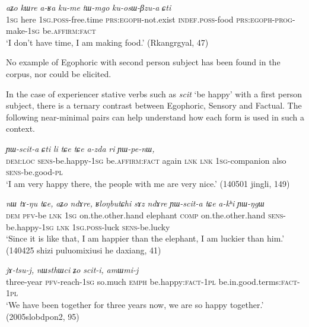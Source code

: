 \documentclass[oldfontcommands,oneside,a4paper,11pt]{article}
\newcommand{\ipa}[1]{{\phon\textit{#1}}} %
\newcommand{\factual}[1]{\textsc{:fact}}
\begin{document}
\begin{exe}
\ex \label{ex:kume}
\gll 
\ipa{aʑo}  	\ipa{kɯre}  	\ipa{a-ʁa}  	\ipa{ku-me}  \ipa{tɯ-mgo} 	\ipa{ku-osɯ-βzu-a} 	\ipa{ɕti} 	  	\\
\textsc{1sg} here \textsc{1sg.poss}-free.time \textsc{prs:egoph}-not.exist \textsc{indef.poss}-food \textsc{prs:egoph}-\textsc{prog}-make-\textsc{1sg} be.\textsc{affirm}\factual{}  \\
\glt `I don't have time, I am making food.'  (Rkangrgyal, 47)
\end{exe}

No example of Egophoric with second person subject has been found in the corpus, nor could be elicited.

In the case of experiencer stative verbs such as \ipa{scit} `be happy' with a first person subject, there is a ternary contrast between Egophoric, Sensory and Factual. The following near-minimal pairs can help understand how each form is used in such a context.

\begin{exe}
\ex \label{ex:YWscita}
\gll  \ipa{nɯtɕu} 	\ipa{ɲɯ-scit-a} 	\ipa{ɕti} 	\ipa{li} 	\ipa{tɕe} 	\ipa{tɕe} 	\ipa{a-zda} 	\ipa{ri} 	\ipa{ɲɯ-pe-nɯ,} \\
\textsc{dem:loc} \textsc{sens}-be.happy-\textsc{1sg} be.\textsc{affirm}:\textsc{fact} again \textsc{lnk} \textsc{lnk} \textsc{1sg}-companion also \textsc{sens}-be.good-\textsc{pl} \\
\glt `I am very happy there, the people with me are very nice.' (140501 jingli, 149)
\end{exe}


\begin{exe}
\ex \label{ex:YWscita2}
\gll 
\ipa{nɯ} 	\ipa{tɤ-ŋu} 	\ipa{tɕe,} 	\ipa{aʑo} 	\ipa{ndɤre,} 	\ipa{ʁloŋbutɕhi} 	\ipa{sɤz} 	\ipa{ndɤre} 	\ipa{ɲɯ-scit-a} 	\ipa{tɕe} 	\ipa{a-kʰi} 	\ipa{ɲɯ-ŋgɯ} \\
\textsc{dem} \textsc{pfv}-be \textsc{lnk} \textsc{1sg} on.the.other.hand elephant \textsc{comp} on.the.other.hand \textsc{sens}-be.happy-\textsc{1sg} \textsc{lnk} \textsc{1sg.poss}-luck \textsc{sens}-be.lucky \\
\glt `Since it is like that, I am happier than the elephant, I am luckier than him.' (140425 shizi puluomixiusi he daxiang, 41)
\end{exe}


\begin{exe}
\ex \label{ex:sciti}
\gll \ipa{χsɯ-xpa} 	\ipa{jɤ-tsu-j,} 	\ipa{nɯsthɯci} 	\ipa{ʑo} \ipa{scit-i,} 	\ipa{amɯmi-j}  \\
three-year \textsc{pfv}-reach-\textsc{1sg} so.much \textsc{emph} be.happy:\textsc{fact-1pl} be.in.good.terms:\textsc{fact-1pl} \\
\glt `We have been together for three years now, we are so happy together.' (2005slobdpon2, 95)
\end{exe}
\end{document}
